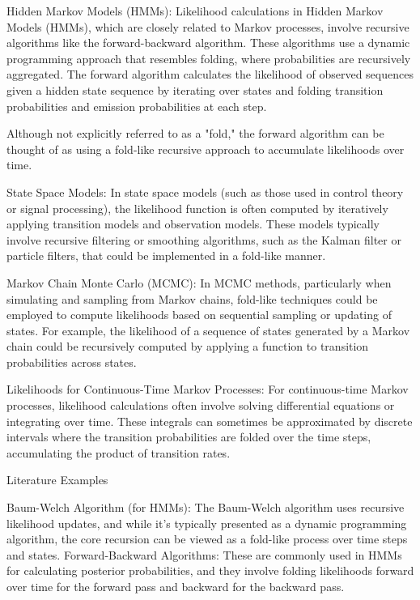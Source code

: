 \documentclass[pdflatex,sn-mathphys-num]{sn-jnl}%
\theoremstyle{thmstyleone}%
\theoremstyle{thmstyletwo}%
\theoremstyle{thmstylethree}%
\begin{document}
Hidden Markov Models (HMMs):
Likelihood calculations in Hidden Markov Models (HMMs), which are closely related to Markov processes, involve recursive algorithms like the forward-backward algorithm. These algorithms use a dynamic programming approach that resembles folding, where probabilities are recursively aggregated.
The forward algorithm calculates the likelihood of observed sequences given a hidden state sequence by iterating over states and folding transition probabilities and emission probabilities at each step.

Although not explicitly referred to as a "fold," the forward algorithm can be thought of as using a fold-like recursive approach to accumulate likelihoods over time.

State Space Models:
In state space models (such as those used in control theory or signal processing), the likelihood function is often computed by iteratively applying transition models and observation models. These models typically involve recursive filtering or smoothing algorithms, such as the Kalman filter or particle filters, that could be implemented in a fold-like manner.

Markov Chain Monte Carlo (MCMC):
In MCMC methods, particularly when simulating and sampling from Markov chains, fold-like techniques could be employed to compute likelihoods based on sequential sampling or updating of states. For example, the likelihood of a sequence of states generated by a Markov chain could be recursively computed by applying a function to transition probabilities across states.

Likelihoods for Continuous-Time Markov Processes:
For continuous-time Markov processes, likelihood calculations often involve solving differential equations or integrating over time. These integrals can sometimes be approximated by discrete intervals where the transition probabilities are folded over the time steps, accumulating the product of transition rates.

Literature Examples

Baum-Welch Algorithm (for HMMs): The Baum-Welch algorithm uses recursive likelihood updates, and while it's typically presented as a dynamic programming algorithm, the core recursion can be viewed as a fold-like process over time steps and states.
Forward-Backward Algorithms: These are commonly used in HMMs for calculating posterior probabilities, and they involve folding likelihoods forward over time for the forward pass and backward for the backward pass.
\end{document}
